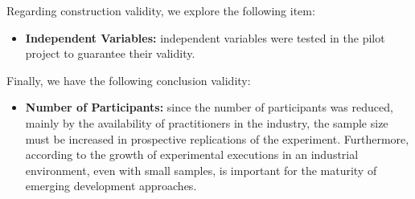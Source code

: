 Regarding construction validity, we explore the following item:

\begin{itemize}

\item \textbf{Independent Variables:} independent variables were tested in the pilot project to guarantee their validity.

\end{itemize}

Finally, we have the following conclusion validity:

\begin{itemize}

\item \textbf{Number of Participants:} since the number of participants was reduced, mainly by the availability of practitioners in the industry, the sample size must be increased in prospective replications of the experiment. Furthermore, according to \cite{falessi2017,host2000} the growth of experimental executions in an industrial environment, even with small samples, is important for the maturity of emerging development approaches.

\end{itemize}
